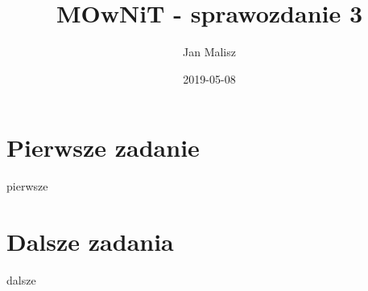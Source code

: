 \documentclass[10pt,a4paper]{article}
\title{MOwNiT - sprawozdanie 3}
\author{Jan Malisz}
\date{2019-05-08}
\begin{document}
  \maketitle
  \thispagestyle{empty}
  \newpage

  \section*{Pierwsze zadanie}\label{sec:PierwszeZadanie}
  {pierwsze}

  \section*{Dalsze zadania}\label{sec:DalszeZadania}
  {dalsze}
\end{document}
